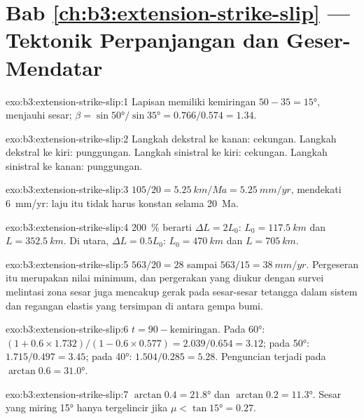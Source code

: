 \section*{Bab \ref{ch:b3:extension-strike-slip} --- Tektonik Perpanjangan dan Geser-Mendatar}

\begin{solution}{exo:b3:extension-strike-slip:1}
Lapisan memiliki kemiringan $50 - 35 = \ang{15}$, menjauhi sesar; $\beta =
\sin\ang{50}/\sin\ang{35} = 0.766/0.574 = 1.34$.
\end{solution}

\begin{solution}{exo:b3:extension-strike-slip:2}
Langkah dekstral ke kanan: cekungan. Langkah dekstral ke kiri: punggungan. Langkah
sinistral ke kiri: cekungan. Langkah sinistral ke kanan: punggungan.
\end{solution}

\begin{solution}{exo:b3:extension-strike-slip:3}
$105/20 = \qty{5.25}{km/Ma} = \qty{5.25}{mm/yr}$, mendekati
\qty{6}{mm/yr}: laju itu tidak harus konstan selama \qty{20}{Ma}.
\end{solution}

\begin{solution}{exo:b3:extension-strike-slip:4}
\qty{200}{\percent} berarti $\Delta L = 2L_0$: $L_0 = \qty{117.5}{km}$ dan $L
= \qty{352.5}{km}$. Di utara, $\Delta L = 0.5L_0$: $L_0 = \qty{470}{km}$
dan $L = \qty{705}{km}$.
\end{solution}

\begin{solution}{exo:b3:extension-strike-slip:5}
$563/20 = 28$ sampai $563/15 = \qty{38}{mm/yr}$. Pergeseran itu merupakan nilai
minimum, dan pergerakan yang diukur dengan survei melintasi zona sesar juga
mencakup gerak pada sesar-sesar tetangga dalam sistem dan regangan elastis yang
tersimpan di antara gempa bumi.
\end{solution}

\begin{solution}{exo:b3:extension-strike-slip:6}
$t = 90 - \text{kemiringan}$. Pada \ang{60}: $(1 + 0.6\times1.732)/(1 - 0.6\times
0.577) = 2.039/0.654 = 3.12$; pada \ang{50}: $1.715/0.497 = 3.45$; pada
\ang{40}: $1.504/0.285 = 5.28$. Penguncian terjadi pada $\arctan0.6 = \ang{31.0}$.
\end{solution}

\begin{solution}{exo:b3:extension-strike-slip:7}
$\arctan0.4 = \ang{21.8}$ dan $\arctan0.2 = \ang{11.3}$. Sesar yang miring
\ang{15} hanya tergelincir jika $\mu < \tan\ang{15} = 0.27$.
\end{solution}

